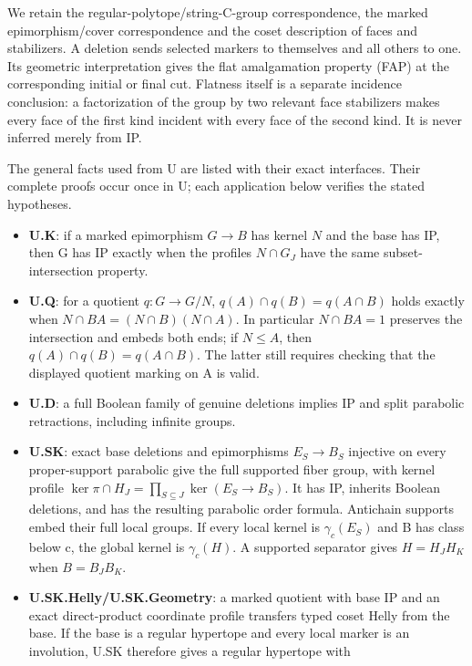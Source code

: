 \documentclass[
  11pt,
  a4paper,
]{article}
\begin{document}
We retain the regular-polytope/string-C-group correspondence, the marked
epimorphism/cover correspondence and the coset description of faces and
stabilizers. A deletion sends selected markers to themselves and all
others to one. Its geometric interpretation gives the flat amalgamation
property (FAP) at the corresponding initial or final cut. Flatness
itself is a separate incidence conclusion: a factorization of the group
by two relevant face stabilizers makes every face of the first kind
incident with every face of the second kind. It is never inferred merely
from IP.

The general facts used from U are listed with their exact interfaces.
Their complete proofs occur once in U; each application below verifies
the stated hypotheses.

\begin{itemize}
\item
  \textbf{U.K}: if a marked epimorphism \(G\to B\) has kernel \(N\) and
  the base has IP, then G has IP exactly when the profiles \(N\cap G_J\)
  have the same subset-intersection property.
\item
  \textbf{U.Q}: for a quotient \(q:G\to G/N\),
  \(q(A)\cap q(B)=q(A\cap B)\) holds exactly when
  \(N\cap BA=(N\cap B)(N\cap A)\). In particular \(N\cap BA=1\)
  preserves the intersection and embeds both ends; if \(N\le A\), then
  \(q(A)\cap q(B)=q(A\cap B)\). The latter still requires checking that
  the displayed quotient marking on A is valid.
\item
  \textbf{U.D}: a full Boolean family of genuine deletions implies IP
  and split parabolic retractions, including infinite groups.
\item
  \textbf{U.SK}: exact base deletions and epimorphisms \(E_S\to B_S\)
  injective on every proper-support parabolic give the full supported
  fiber group, with kernel profile
  \(\ker\pi\cap H_J=\prod_{S\subseteq J}\ker(E_S\to B_S)\). It has IP,
  inherits Boolean deletions, and has the resulting parabolic order
  formula. Antichain supports embed their full local groups. If every
  local kernel is \(\gamma_c(E_S)\) and B has class below c, the global
  kernel is \(\gamma_c(H)\). A supported separator gives \(H=H_JH_K\)
  when \(B=B_JB_K\).
\item
  \textbf{U.SK.Helly/U.SK.Geometry}: a marked quotient with base IP and
  an exact direct-product coordinate profile transfers typed coset Helly
  from the base. If the base is a regular hypertope and every local
  marker is an involution, U.SK therefore gives a regular hypertope with

\end{itemize}
\end{document}
